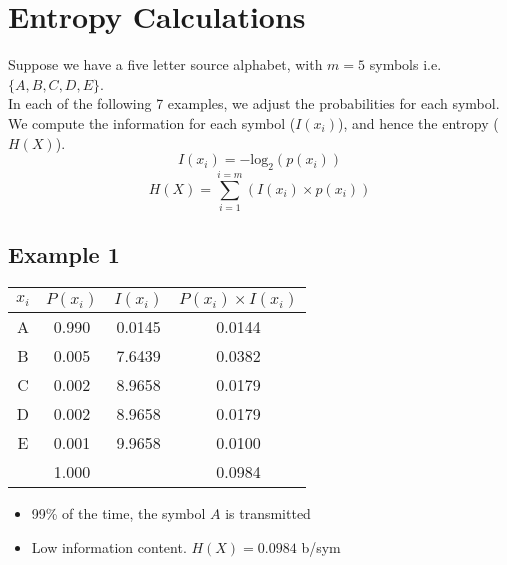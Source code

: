 \documentclass[a4paper,12pt]{article}
\begin{document}
	\Large 
	
	
	
	\section*{Entropy Calculations}
	Suppose we have a five letter source alphabet, with $m=5$ symbols i.e. $\{A,B,C,D,E\}$.\\
	
	\medskip 
	\noindent In each of the following 7 examples, we adjust the probabilities for each symbol. We compute the information for each symbol ($I(x_i)$), and hence the entropy ($H(X)$).
	\[ I(x_i) = -\mbox{log}_2(p(x_i)) \]
	\[ H(X) = \sum^{i=m}_{i=1} (I(x_i) \times p(x_i)) \]
	
	\newpage
	\subsection*{Example 1}
	{
		\Large 
		\begin{center}\begin{tabular}{|c||c|c|c|}
				\hline
				\phantom{spa}  $x_i$	\phantom{spa} &	\phantom{spa}$P(x_i)$	\phantom{spa}&		\phantom{spa}$I(x_i)$\phantom{spa}&		$P(x_i) \times I(x_i)$	\\ \hline	\hline
				A	&	0.990	&	0.0145	&	0.0144	\\ \hline	
				B	&	0.005	&	7.6439	&	0.0382	\\ \hline	
				C	&	0.002	&	8.9658	&	0.0179	\\ \hline	
				D	&	0.002	&	8.9658	&	0.0179	\\ \hline	
				E	&	0.001	&	9.9658	&	0.0100	\\ \hline	\hline
				&	1.000	&		&	0.0984	\\ \hline	
			\end{tabular} 
	
	\end{center}
		}
	\begin{itemize}
		\item 99\% of the time, the symbol $A$ is transmitted
		\item Low information content. $H(X) = 0.0984 $ b/sym
	\end{itemize}
	
	
\end{document}
